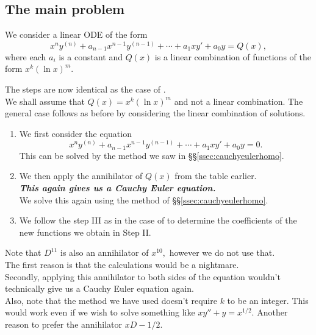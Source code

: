 \subsection{The main problem}
\begin{mdframed}[style=boxstyle, frametitle={The Setup}]
	We consider a linear ODE of the form
	\begin{equation} 
		x^ny^{(n)} + a_{n-1}x^{n-1}y^{(n-1)} + \cdots + a_{1}xy' + a_0y = Q(x),
	\end{equation}
	where each $a_i$ is a constant and $Q(x)$ is a linear combination of functions of the form $x^k(\ln x)^m$.
\end{mdframed}
\begin{mdframed}[style=boxstyle, frametitle={The Solution}]
	The steps are now identical as the case of .\\
	We shall assume that $Q(x) = x^k(\ln x)^m$ and not a linear combination. The general case follows as before by considering the linear combination of solutions.
	\begin{enumerate}[leftmargin=*, label = \Roman*.]
		\item We first consider the equation
		\begin{equation*} 
			x^ny^{(n)} + a_{n-1}x^{n-1}y^{(n-1)} + \cdots + a_{1}xy' + a_0y = 0.
		\end{equation*}
		This can be solved by the method we saw in \S\S\ref{ssec:cauchyeulerhomo}.
		\item We then apply the annihilator of $Q(x)$ from the table earlier.\\
		\textbf{\emph{This again gives us a Cauchy Euler equation.}}\\
		We solve this again using the method of \S\S\ref{ssec:cauchyeulerhomo}.
		\item We follow the step III as in the case of  to determine the coefficients of the new functions we obtain in Step II.
	\end{enumerate}
\end{mdframed}
Note that $D^{11}$ is also an annihilator of $x^{10},$ however we do not use that.\\
The first reason is that the calculations would be a nightmare.\\
Secondly, applying this annihilator to both sides of the equation wouldn't technically give us a Cauchy Euler equation again. \\
Also, note that the method we have used doesn't require $k$ to be an integer. This would work even if we wish to solve something like $xy'' + y = x^{1/2}.$ Another reason to prefer the annihilator $xD - 1/2.$